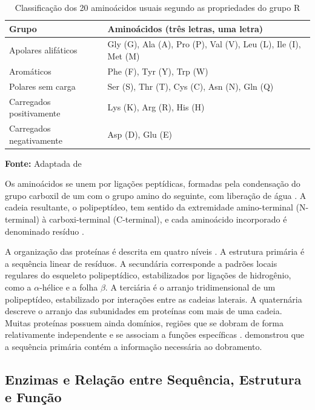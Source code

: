 \FloatBarrier
\begin{table}[!htbp]
	\centering
	\SingleSpacing\small
	\caption{Classificação dos 20 aminoácidos usuais segundo as propriedades do grupo R}
	\begin{tabularx}{\textwidth}{@{}lX@{}}
		\toprule
		\textbf{Grupo} & \textbf{Aminoácidos (três letras, uma letra)} \\
		\midrule
		Apolares alifáticos      & Gly (G), Ala (A), Pro (P), Val (V), Leu (L), Ile (I), Met (M) \\
		Aromáticos               & Phe (F), Tyr (Y), Trp (W) \\
		Polares sem carga        & Ser (S), Thr (T), Cys (C), Asn (N), Gln (Q) \\
		Carregados positivamente & Lys (K), Arg (R), His (H) \\
		Carregados negativamente & Asp (D), Glu (E) \\
		\bottomrule
	\end{tabularx}
	\par\vspace{0.2cm}
	\textbf{Fonte:} Adaptada de 
	\label{tab:aminoacidos}
\end{table}

Os aminoácidos se unem por ligações peptídicas, formadas pela condensação do grupo carboxil de um com o grupo amino do seguinte, com liberação de água \cite{Nelson2014}. A cadeia resultante, o polipeptídeo, tem sentido da extremidade amino-terminal (N-terminal) à carboxi-terminal (C-terminal), e cada aminoácido incorporado é denominado resíduo \cite{Nelson2014}.

A organização das proteínas é descrita em quatro níveis \cite{Nelson2014}. A estrutura primária é a sequência linear de resíduos. A secundária corresponde a padrões locais regulares do esqueleto polipeptídico, estabilizados por ligações de hidrogênio, como a $\alpha$-hélice \cite{Pauling1951} e a folha $\beta$. A terciária é o arranjo tridimensional de um polipeptídeo, estabilizado por interações entre as cadeias laterais. A quaternária descreve o arranjo das subunidades em proteínas com mais de uma cadeia. Muitas proteínas possuem ainda domínios, regiões que se dobram de forma relativamente independente e se associam a funções específicas \cite{Alberts2017}.  demonstrou que a sequência primária contém a informação necessária ao dobramento.

\subsection{Enzimas e Relação entre Sequência, Estrutura e Função}

